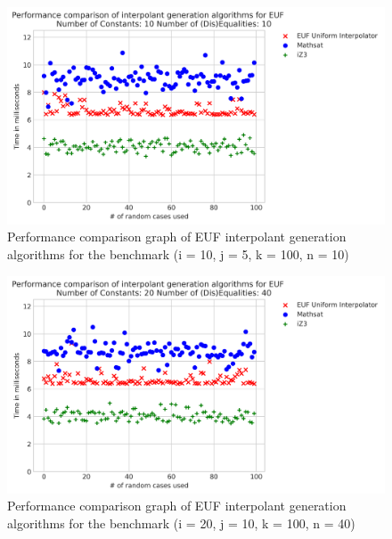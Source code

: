 \begin{figure}
  \centering
  \includegraphics[scale=0.7]{figures/eufi_performance_graph_10_5_3_10_100}
  \caption{Performance comparison graph of EUF interpolant generation
  algorithms for the benchmark (i = 10, j = 5, k = 100, n = 10)}
  \label{performance_graph_euf}
\end{figure}

\begin{figure}
  \centering
  \includegraphics[scale=0.7]{figures/eufi_performance_graph_20_10_3_40_100}
  \caption{Performance comparison graph of EUF interpolant generation
  algorithms for the benchmark (i = 20, j = 10, k = 100, n = 40)} 

  \label{performance_graph_euf_2}
\end{figure}


